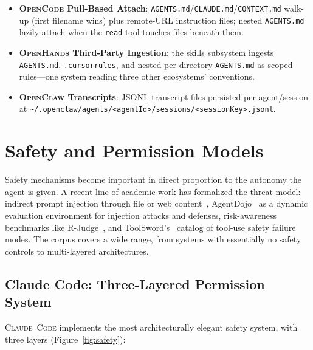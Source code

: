 \documentclass[11pt,a4paper]{article}
\newcommand{\clcode}{\textsc{Claude~Code}\xspace}
\newcommand{\oh}{\textsc{OpenHands}\xspace}
\newcommand{\ocl}{\textsc{OpenClaw}\xspace}
\newcommand{\ocd}{\textsc{OpenCode}\xspace}
\begin{document}
\begin{itemize}[itemsep=1pt]
  \item \textbf{\ocd{} Pull-Based Attach}: \texttt{AGENTS.md}/\texttt{CLAUDE.md}/\texttt{CONTEXT.md} walk-up (first filename wins) plus remote-URL instruction files; nested \texttt{AGENTS.md} lazily attach when the \texttt{read} tool touches files beneath them.

  \item \textbf{\oh{} Third-Party Ingestion}: the skills subsystem ingests \texttt{AGENTS.md}, \texttt{.cursorrules}, and nested per-directory \texttt{AGENTS.md} as scoped rules---one system reading three other ecosystems' conventions.

  \item \textbf{\ocl{} Transcripts}: JSONL transcript files persisted per agent/session at \linebreak\texttt{\textasciitilde/.openclaw/agents/<agentId>/sessions/<sessionKey>.jsonl}.
\end{itemize}

\section{Safety and Permission Models}
\label{sec:safety}

Safety mechanisms become important in direct proportion to the autonomy the agent is given.
A recent line of academic work has formalized the threat model: indirect prompt injection through file or web content~\cite{greshake2023indirect}, AgentDojo~\cite{debenedetti2024agentdojo} as a dynamic evaluation environment for injection attacks and defenses, risk-awareness benchmarks like R-Judge~\cite{yuan2024rjudge}, and ToolSword's~\cite{ye2024toolsword} catalog of tool-use safety failure modes.
The corpus covers a wide range, from systems with essentially no safety controls to multi-layered architectures.

\subsection{Claude Code: Three-Layered Permission System}

\clcode{} implements the most architecturally elegant safety system, with three layers (Figure~\ref{fig:safety}):
\end{document}
